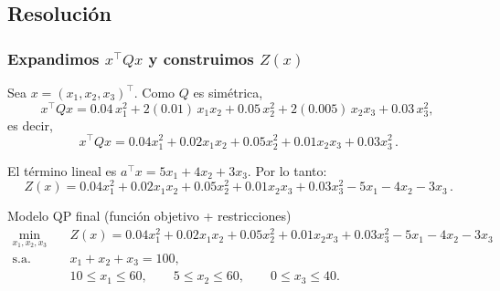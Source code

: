 \documentclass[12pt]{article}
\begin{document}
\subsection{Resolución}

\subsubsection{Expandimos $x^\top Q x$ y construimos $Z(x)$}
Sea $x=(x_1,x_2,x_3)^\top$. Como $Q$ es simétrica,
\[
x^\top Q x
=0.04\,x_1^2
+2(0.01)\,x_1x_2
+0.05\,x_2^2
+2(0.005)\,x_2x_3
+0.03\,x_3^2,
\]
es decir,
\[
\boxed{\,x^\top Q x = 0.04x_1^2 + 0.02x_1x_2 + 0.05x_2^2 + 0.01x_2x_3 + 0.03x_3^2\, }.
\]

El término lineal es $a^\top x=5x_1+4x_2+3x_3$. Por lo tanto:
\[
\boxed{\,Z(x)
= 0.04x_1^2 + 0.02x_1x_2 + 0.05x_2^2 + 0.01x_2x_3 + 0.03x_3^2
- 5x_1 - 4x_2 - 3x_3\, }.
\]

Modelo QP final (función objetivo + restricciones)
\[
\boxed{
\begin{aligned}
\min_{x_1,x_2,x_3}\quad
& Z(x)=
0.04x_1^2 + 0.02x_1x_2 + 0.05x_2^2 + 0.01x_2x_3 + 0.03x_3^2
- 5x_1 - 4x_2 - 3x_3 \\[4pt]
\text{s.a.}\quad
& x_1 + x_2 + x_3 = 100,\\
& 10 \le x_1 \le 60,\qquad 5 \le x_2 \le 60,\qquad 0 \le x_3 \le 40.
\end{aligned}}
\]
\end{document}
